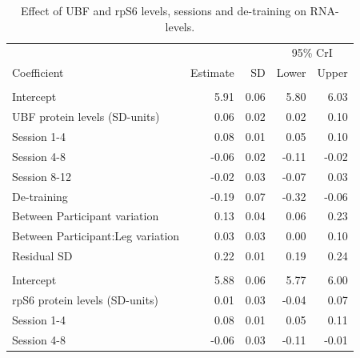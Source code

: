 \documentclass[twoside,10pt]{gihclass} %
\begin{document}
\begin{table}

\caption{\label{tab:ubf-rps6-regression-table}Effect of UBF and rpS6 levels, sessions and de-training on RNA-levels.}
\centering
\fontsize{7}{9}\selectfont
\begin{threeparttable}
\begin{tabular}[t]{lrrrr}
\toprule
\multicolumn{3}{c}{ } & \multicolumn{2}{c}{95\% CrI} \\
\cmidrule(l{3pt}r{3pt}){4-5}
Coefficient & Estimate & SD & Lower & Upper\\
\midrule
\addlinespace[0.3em]
\multicolumn{5}{l}{\textbf{UBF}}\\
\hspace{1em}Intercept & 5.91 & 0.06 & 5.80 & 6.03\\
\hspace{1em}UBF protein levels (SD-units) & 0.06 & 0.02 & 0.02 & 0.10\\
\hspace{1em}Session 1-4 & 0.08 & 0.01 & 0.05 & 0.10\\
\hspace{1em}Session 4-8 & -0.06 & 0.02 & -0.11 & -0.02\\
\hspace{1em}Session 8-12 & -0.02 & 0.03 & -0.07 & \vphantom{1} 0.03\\
\hspace{1em}De-training & -0.19 & 0.07 & -0.32 & -0.06\\
\hspace{1em}Between Participant variation & 0.13 & 0.04 & 0.06 & 0.23\\
\hspace{1em}Between Participant:Leg variation & 0.03 & 0.03 & 0.00 & 0.10\\
\hspace{1em}Residual SD & 0.22 & 0.01 & 0.19 & 0.24\\
\addlinespace[0.3em]
\multicolumn{5}{l}{\textbf{rpS6}}\\
\hspace{1em}Intercept & 5.88 & 0.06 & 5.77 & 6.00\\
\hspace{1em}rpS6 protein levels (SD-units) & 0.01 & 0.03 & -0.04 & 0.07\\
\hspace{1em}Session 1-4 & 0.08 & 0.01 & 0.05 & 0.11\\
\hspace{1em}Session 4-8 & -0.06 & 0.03 & -0.11 & -0.01\\

\end{tabular}
\end{threeparttable}
\end{table}
\end{document}
